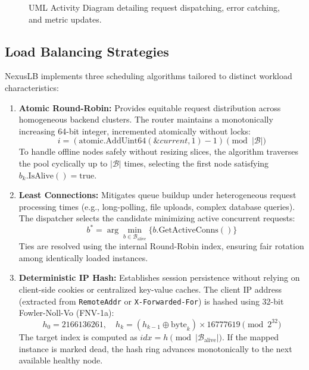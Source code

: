 \documentclass[12pt,openany]{report}
\begin{document}
\begin{figure}[H]
{%
}
\caption{UML Activity Diagram detailing request dispatching, error catching, and metric updates.}
\label{fig:activity_diagram}
\end{figure}

\clearpage
\subsection{Load Balancing Strategies}

NexusLB implements three scheduling algorithms tailored to distinct workload characteristics:

\begin{enumerate}
  \item \textbf{Atomic Round-Robin:} Provides equitable request distribution across homogeneous backend clusters. The router maintains a monotonically increasing 64-bit integer, incremented atomically without locks:
  \begin{equation}
    i = (\text{atomic.AddUint64}(\&current, 1) - 1) \pmod{|\mathcal{B}|}
  \end{equation}
  To handle offline nodes safely without resizing slices, the algorithm traverses the pool cyclically up to $|\mathcal{B}|$ times, selecting the first node satisfying $b_k.\text{IsAlive}() = \text{true}$.
  \item \textbf{Least Connections:} Mitigates queue buildup under heterogeneous request processing times (e.g., long-polling, file uploads, complex database queries). The dispatcher selects the candidate minimizing active concurrent requests:
  \begin{equation}
    b^* = \arg\min_{b \in \mathcal{B}_{\text{alive}}} \{ b.\text{GetActiveConns}() \}
  \end{equation}
  Ties are resolved using the internal Round-Robin index, ensuring fair rotation among identically loaded instances.
  \item \textbf{Deterministic IP Hash:} Establishes session persistence without relying on client-side cookies or centralized key-value caches. The client IP address (extracted from \texttt{RemoteAddr} or \texttt{X-Forwarded-For}) is hashed using 32-bit Fowler-Noll-Vo (FNV-1a):
  \begin{equation}
    h_0 = 2166136261, \quad h_k = (h_{k-1} \oplus \text{byte}_k) \times 16777619 \pmod{2^{32}}
  \end{equation}
  The target index is computed as $idx = h \pmod{|\mathcal{B}_{\text{alive}}|}$. If the mapped instance is marked dead, the hash ring advances monotonically to the next available healthy node.
\end{enumerate}
\end{document}
